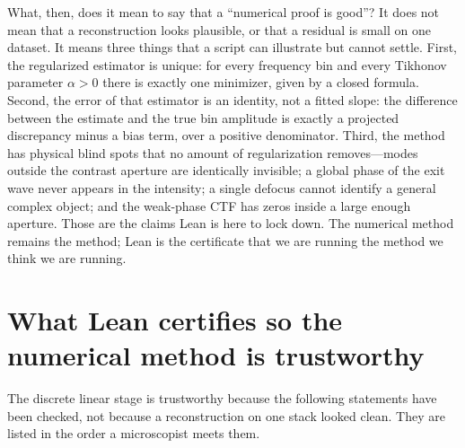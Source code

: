 What, then, does it mean to say that a ``numerical proof is good''?
It does not mean that a reconstruction looks plausible, or that a
residual is small on one dataset.
It means three things that a script can illustrate but cannot settle.
First, the regularized estimator is unique: for every frequency bin and
every Tikhonov parameter $\alpha>0$ there is exactly one minimizer,
given by a closed formula.
Second, the error of that estimator is an identity, not a fitted slope:
the difference between the estimate and the true bin amplitude is
exactly a projected discrepancy minus a bias term, over a positive
denominator.
Third, the method has physical blind spots that no amount of
regularization removes---modes outside the contrast aperture are
identically invisible; a global phase of the exit wave never appears
in the intensity; a single defocus cannot identify a general complex
object; and the weak-phase CTF has zeros inside a large enough
aperture.
Those are the claims Lean is here to lock down.
The numerical method remains the method; Lean is the certificate that
we are running the method we think we are running.

\section{What Lean certifies so the numerical method is trustworthy}
\label{sec:what-lean-certifies}

The discrete linear stage is trustworthy because the following
statements have been checked, not because a reconstruction on one stack
looked clean.
They are listed in the order a microscopist meets them.

